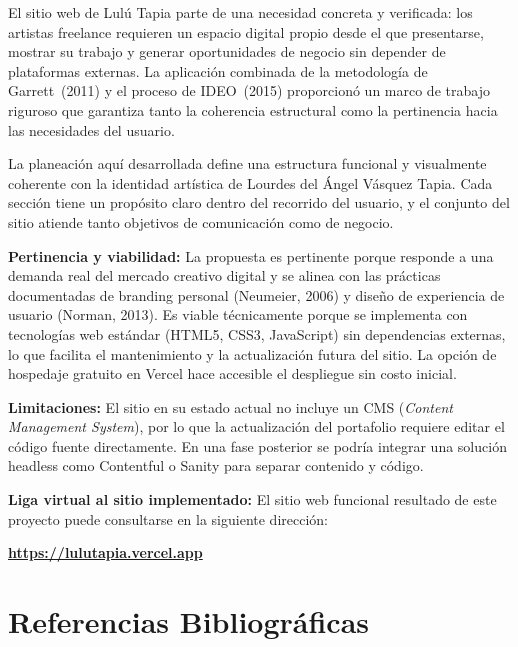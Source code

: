 \documentclass[12pt, letterpaper]{article}
\begin{document}
El sitio web de Lulú Tapia parte de una necesidad concreta y verificada: los artistas freelance requieren un espacio digital propio desde el que presentarse, mostrar su trabajo y generar oportunidades de negocio sin depender de plataformas externas. La aplicación combinada de la metodología de Garrett~(2011) y el proceso de IDEO~(2015) proporcionó un marco de trabajo riguroso que garantiza tanto la coherencia estructural como la pertinencia hacia las necesidades del usuario.

La planeación aquí desarrollada define una estructura funcional y visualmente coherente con la identidad artística de Lourdes del Ángel Vásquez Tapia. Cada sección tiene un propósito claro dentro del recorrido del usuario, y el conjunto del sitio atiende tanto objetivos de comunicación como de negocio.

\textbf{Pertinencia y viabilidad:} La propuesta es pertinente porque responde a una demanda real del mercado creativo digital y se alinea con las prácticas documentadas de branding personal (Neumeier, 2006) y diseño de experiencia de usuario (Norman, 2013). Es viable técnicamente porque se implementa con tecnologías web estándar (HTML5, CSS3, JavaScript) sin dependencias externas, lo que facilita el mantenimiento y la actualización futura del sitio. La opción de hospedaje gratuito en Vercel hace accesible el despliegue sin costo inicial.

\textbf{Limitaciones:} El sitio en su estado actual no incluye un CMS (\textit{Content Management System}), por lo que la actualización del portafolio requiere editar el código fuente directamente. En una fase posterior se podría integrar una solución headless como Contentful o Sanity para separar contenido y código.

\textbf{Liga virtual al sitio implementado:} El sitio web funcional resultado de este proyecto puede consultarse en la siguiente dirección:

\begin{tcolorbox}[
  colback=luluPurple!8, colframe=luluPurple,
  arc=4pt, boxrule=0.8pt,
  left=10pt, right=10pt, top=8pt, bottom=8pt
]
\centering
{\large\bfseries\color{luluPurple} \url{https://lulutapia.vercel.app}}
\end{tcolorbox}


\section{Referencias Bibliográficas}
\end{document}

